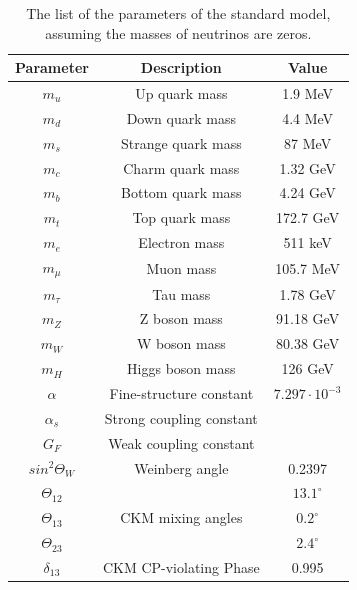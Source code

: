 \begin{table}[ht!]
\centering
\begin{tabular}{c|c|c} \hline\hline
Parameter & Description & Value \\\hline

$m_{u}$ & Up quark mass &  1.9 MeV \\
$m_{d}$ & Down quark mass & 4.4 MeV \\
$m_{s}$ & Strange quark mass & 87 MeV \\
$m_{c}$ & Charm quark mass & 1.32 GeV \\
$m_{b}$ & Bottom quark mass & 4.24 GeV \\
$m_{t}$ & Top quark mass & 172.7 GeV \\
\hline
$m_{e}$ & Electron mass & 511 keV \\
$m_{\mu}$ & Muon mass & 105.7 MeV \\
$m_{\tau}$ & Tau mass & 1.78 GeV \\
\hline
$m_{Z}$ & Z boson mass & 91.18 GeV \\
$m_{W}$ & W boson mass & 80.38 GeV \\
$m_{H}$ & Higgs boson mass & 126 GeV \\
\hline
$\alpha$ & Fine-structure constant & $7.297 \cdot 10^{-3}$\\
$\alpha_{s}$ & Strong coupling constant & \\
$G_{F}$ & Weak coupling constant & \\
\hline
$sin^{2} \Theta_{W}$ & Weinberg angle & 0.2397 \\
\hline
$\Theta_{12}$ &\multirow{3}{*}{CKM mixing angles}& $13.1^{\circ}$ \\
$\Theta_{13}$ && $0.2^{\circ}$ \\
$\Theta_{23}$ && $2.4^{\circ}$ \\
$\delta_{13}$ & CKM CP-violating Phase & 0.995 \\
\hline\hline
\end{tabular}
\caption{The list of the parameters of the standard model, assuming the masses of neutrinos are zeros.}
\label{tab:SM_parameters}
\end{table}

